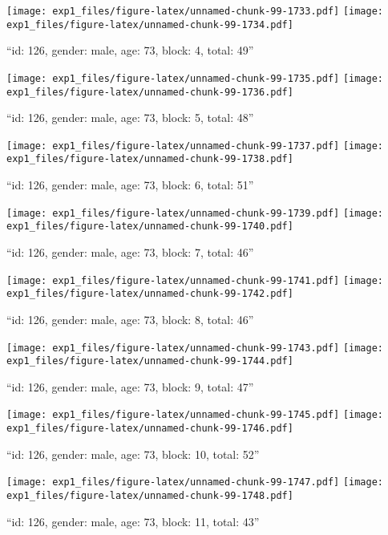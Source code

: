 \documentclass[,]{article}
\begin{document}
\texttt{[image: exp1\_files/figure-latex/unnamed-chunk-99-1733.pdf]}
\texttt{[image: exp1\_files/figure-latex/unnamed-chunk-99-1734.pdf]}

\newpage
[1] 

``id: 126, gender: male, age: 73, block: 4, total: 49''

\texttt{[image: exp1\_files/figure-latex/unnamed-chunk-99-1735.pdf]}
\texttt{[image: exp1\_files/figure-latex/unnamed-chunk-99-1736.pdf]}

\newpage
[1] 

``id: 126, gender: male, age: 73, block: 5, total: 48''

\texttt{[image: exp1\_files/figure-latex/unnamed-chunk-99-1737.pdf]}
\texttt{[image: exp1\_files/figure-latex/unnamed-chunk-99-1738.pdf]}

\newpage
[1] 

``id: 126, gender: male, age: 73, block: 6, total: 51''

\texttt{[image: exp1\_files/figure-latex/unnamed-chunk-99-1739.pdf]}
\texttt{[image: exp1\_files/figure-latex/unnamed-chunk-99-1740.pdf]}

\newpage
[1] 

``id: 126, gender: male, age: 73, block: 7, total: 46''

\texttt{[image: exp1\_files/figure-latex/unnamed-chunk-99-1741.pdf]}
\texttt{[image: exp1\_files/figure-latex/unnamed-chunk-99-1742.pdf]}

\newpage
[1] 

``id: 126, gender: male, age: 73, block: 8, total: 46''

\texttt{[image: exp1\_files/figure-latex/unnamed-chunk-99-1743.pdf]}
\texttt{[image: exp1\_files/figure-latex/unnamed-chunk-99-1744.pdf]}

\newpage
[1] 

``id: 126, gender: male, age: 73, block: 9, total: 47''

\texttt{[image: exp1\_files/figure-latex/unnamed-chunk-99-1745.pdf]}
\texttt{[image: exp1\_files/figure-latex/unnamed-chunk-99-1746.pdf]}

\newpage
[1] 

``id: 126, gender: male, age: 73, block: 10, total: 52''

\texttt{[image: exp1\_files/figure-latex/unnamed-chunk-99-1747.pdf]}
\texttt{[image: exp1\_files/figure-latex/unnamed-chunk-99-1748.pdf]}

\newpage
[1] 

``id: 126, gender: male, age: 73, block: 11, total: 43''
\end{document}

